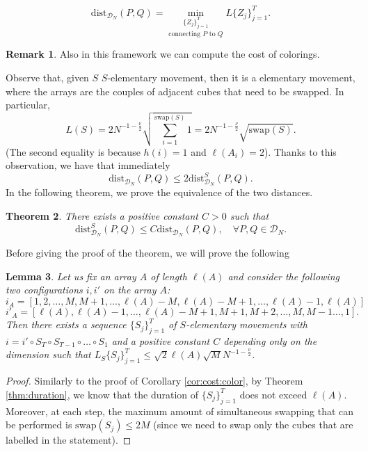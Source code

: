 \documentclass[12 pt]{article}
\theoremstyle{definition} \newtheorem{definition}{Definition}[section]
\theoremstyle{definition} \newtheorem{remark}[definition]{Remark}
\theoremstyle{plain} \newtheorem{lemma}[definition]{Lemma}
\theoremstyle{plain} \newtheorem{proposition}[definition]{Proposition}
\theoremstyle{plain} \newtheorem{theorem}[definition]{Theorem}
\theoremstyle{plain} \newtheorem{corollary}[definition]{Corollary}
\theoremstyle{definition} \newtheorem{example}[definition]{Example}
\theoremstyle{definition} \newtheorem{assumption}[definition]{Assumption}
\theoremstyle{definition} \newtheorem{conjecture}[definition]{Conjecture}
\newcommand{\1}{\mathbbm 1}
\numberwithin{equation}{section}
\begin{document}
\begin{equation}\label{eq:distance:new}
    \text{dist}_{\mathcal{D}_N}(P,Q)=\underset{ \text{connecting } P\text{ to }Q}{\min_{\lbrace Z_j\rbrace_{j=1}^{T} }} L\lbrace Z_j\rbrace_{j=1}^T.
\end{equation}
\begin{remark}
    Also in this framework we can compute the cost of colorings.
\end{remark}
Observe that, given $S$ $S$-elementary movement, then it is a elementary movement, where the arrays are the couples of adjacent cubes that need to be swapped. In particular,
\begin{equation*}
    L(S)=2N^{-1-\frac{\nu}{2}}\sqrt{\sum_{i=1}^{\text{swap}(S)}1}=2N^{-1-\frac{\nu}{2}}\sqrt{\text{swap}(S)}.
\end{equation*}
(The second equality is because $h(i)=1$ and $\ell(A_i)=2$). Thanks to this observation, we have that
immediately $$\text{dist}_{\mathcal{D}_N}(P,Q)\leq  2\text{dist}^S_{\mathcal{D}_N}(P,Q).$$ In the following theorem, we prove the equivalence of the two distances. 
\begin{theorem}\label{thm:equivalence:distance}
    There exists a positive constant $C>0$ such that
    \begin{equation*}
        \text{dist}^S_{\mathcal{D}_N}(P,Q)\leq C\text{dist}_{\mathcal{D}_N}(P,Q),\quad\forall P,Q\in\mathcal{D}_N.
    \end{equation*}
\end{theorem}
Before giving the proof of the theorem, we will prove the following
\begin{lemma}\label{lem:equivalence:distance}
    Let us fix an array $A$ of length $\ell(A)$ and consider the following two configurations $i,i'$ on the array $A$:
    \begin{equation*}
        i_A=[1,2,\dots,M,M+1,\dots,\ell(A)-M,\ell(A)-M+1,\dots,\ell(A)-1,\ell(A)]
    \end{equation*}
    \begin{equation*}
        i'_A=[\ell(A),\ell(A)-1,\dots,\ell(A)-M+1, M+1,M+2,\dots, M,M-1 \dots,1].
    \end{equation*}
    Then there exists a sequence $\lbrace S_j\rbrace _{j=1}^T$ of $S$-elementary movements with $i=i'\circ S_T\circ S_{T-1}\circ\dots\circ S_1$ and a positive constant $C$ depending only on the dimension such that $L_S\lbrace S_j\rbrace_{j=1}^T\leq \sqrt{2}\ell(A)\sqrt{M}N^{-1-\frac{\nu}{2}}$.  
\end{lemma}
\begin{proof}
Similarly to the proof of Corollary \ref{cor:cost:color}, by Theorem \ref{thm:duration}, we know that the duration of $\lbrace S_j\rbrace_{j=1}^T$ does not exceed $\ell(A)$. Moreover, at each step, the maximum amount of simultaneous swapping that can be performed is $\text{swap}(S_j)\leq 2M$ (since we need to swap only the cubes that are labelled in the statement).  
\end{proof}
\end{document}

